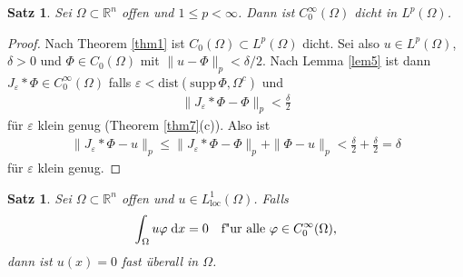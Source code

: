 \documentclass[
paper=a4,
bibtotocnumbered,
liststotocnumbered,
tablecaptionabove,
pointlessnumbers,
twoside,
openright,
10pt
]
{report}
\newcommand{\supp}{\mathrm{supp}\,}
\newcommand{\dist}{\mathrm{dist}}
\let\phi\varphi
\let\epsilon\varepsilon
\newtheorem{satz}[thm]{Satz}
\theoremstyle{definition}
\numberwithin{equation}{chapter}
\begin{document}
\begin{satz}\label{satz8}
Sei $\Omega\subset\mathbb{R}^n$ offen und $1\leq p<\infty$. Dann ist $C_0^\infty(\Omega)$ dicht in $L^p(\Omega)$.
\end{satz}

\begin{proof}
Nach Theorem \ref{thm1} ist $C_0(\Omega)\subset L^p(\Omega)$ dicht. Sei also $u\in L^p(\Omega)$, $\delta>0$ und $\Phi\in C_0(\Omega)$ mit $\|u-\Phi\|_p<\delta/2$. Nach Lemma \ref{lem5} ist dann $J_\epsilon\ast\Phi\in C_0^\infty(\Omega)$ falls $\epsilon<\dist(\supp\Phi,\Omega^c)$ und
\begin{align}
\|J_\epsilon\ast\Phi-\Phi\|_p <\frac{\delta}{2}
\end{align}
für $\epsilon$ klein genug (Theorem \ref{thm7}(c)). Also ist
\begin{align}
\|J_\epsilon\ast\Phi-u\|_p 
\leq \|J_\epsilon\ast\Phi-\Phi\|_p+\|\Phi-u\|_p 
< \frac{\delta}{2}+\frac{\delta}{2}=\delta
\end{align}
für $\epsilon$ klein genug.
\end{proof}

\begin{satz}\label{satz9}
Sei $\Omega\subset\mathbb{R}^n$ offen und $u\in L_{\mathrm{loc}}^1(\Omega)$. Falls
\begin{equation}
\int_\Omega u\phi\d x=0\quad\text{f"ur alle }\phi\in C_0^\infty(\Omega),
\end{equation}
dann ist $u(x)=0$ fast überall in $\Omega$.
\end{satz}
\end{document}
